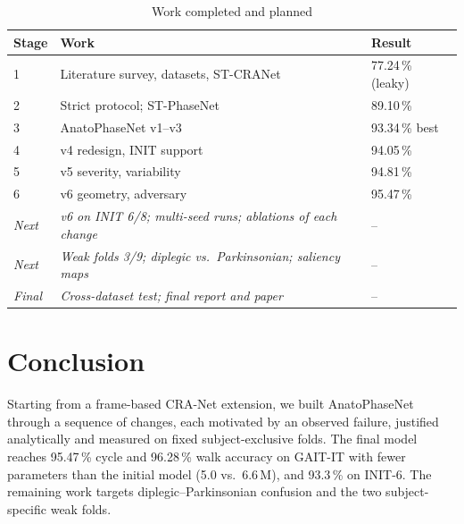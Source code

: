 \documentclass[conference]{IEEEtran}
\begin{document}
\begin{table}[!t]
\centering
\caption{Work completed and planned}
\label{tab:time}
\setlength{\tabcolsep}{3pt}
\begin{tabular}{@{}p{1.6cm}p{4.1cm}p{1.9cm}@{}}
\toprule
Stage & Work & Result \\
\midrule
1 & Literature survey, datasets, ST-CRANet & 77.24\,\% (leaky) \\
2 & Strict protocol; ST-PhaseNet & 89.10\,\% \\
3 & AnatoPhaseNet v1--v3 & 93.34\,\% best \\
4 & v4 redesign, INIT support & 94.05\,\% \\
5 & v5 severity, variability & 94.81\,\% \\
6 & v6 geometry, adversary & 95.47\,\% \\
\midrule
\emph{Next} & \emph{v6 on INIT 6/8; multi-seed runs; ablations of each change} & -- \\
\emph{Next} & \emph{Weak folds 3/9; diplegic vs.\ Parkinsonian; saliency maps} & -- \\
\emph{Final} & \emph{Cross-dataset test; final report and paper} & -- \\
\bottomrule
\end{tabular}
\end{table}

\section{Conclusion}
Starting from a frame-based CRA-Net extension, we built AnatoPhaseNet through
a sequence of changes, each motivated by an observed failure, justified
analytically and measured on fixed subject-exclusive folds. The final model
reaches 95.47\,\% cycle and 96.28\,\% walk accuracy on GAIT-IT with fewer
parameters than the initial model (5.0 vs.\ 6.6\,M), and 93.3\,\% on INIT-6.
The remaining work targets diplegic--Parkinsonian confusion and the two
subject-specific weak folds.
\end{document}
